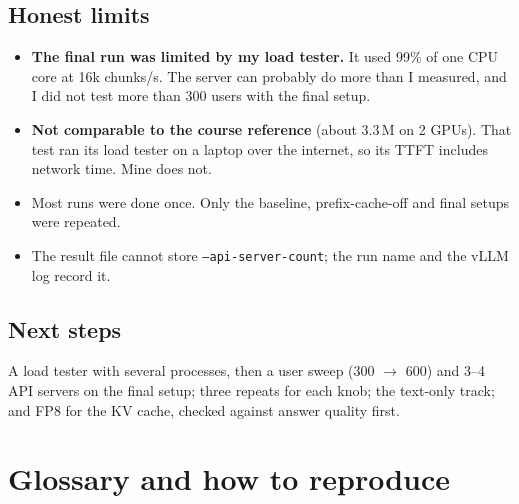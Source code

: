 \documentclass[10pt,a4paper]{article}
\begin{document}
\subsection{Honest limits}
\begin{itemize}
  \item \textbf{The final run was limited by my load tester.} It used 99\% of one CPU core at 16k chunks/s. The server can probably do more than I measured, and I did not test more than 300 users with the final setup.
  \item \textbf{Not comparable to the course reference} (about 3.3\,M on 2 GPUs). That test ran its load tester on a laptop over the internet, so its TTFT includes network time. Mine does not.
  \item Most runs were done once. Only the baseline, prefix-cache-off and final setups were repeated.
  \item The result file cannot store \texttt{--api-server-count}; the run name and the vLLM log record it.
\end{itemize}

\subsection{Next steps}
A load tester with several processes, then a user sweep (300 $\rightarrow$ 600) and 3--4 API servers on the final setup; three repeats for each knob; the text-only track; and FP8 for the KV cache, checked against answer quality first.

\section{Glossary and how to reproduce}
\end{document}
